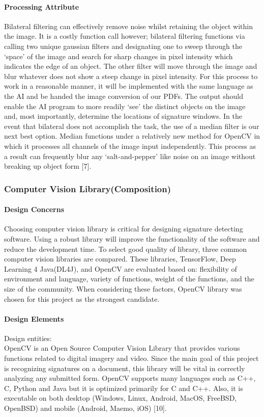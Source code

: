 \documentclass[article, onecolumn, draftclsnofoot,10pt, compsoc]{IEEEtran}
\begin{document}
\paragraph{Processing Attribute}
Bilateral filtering can effectively remove noise whilst retaining the object within the image. It is a costly function call however; bilateral filtering functions via calling two unique gaussian filters and designating one to sweep through the ‘space’ of the image and search for sharp changes in pixel intensity which indicates the edge of an object. The other filter will move through the image and blur whatever does not show a steep change in pixel intensity. For this process to work in a reasonable manner, it will be implemented with the same language as the AI and be handed the image conversion of our PDFs. The output should enable the AI program to more readily ‘see’ the distinct objects on the image and, most importantly, determine the locations of signature windows. In the event that bilateral does not accomplish the task, the use of a median filter is our next best option. Median functions under a relatively new method for OpenCV in which it processes all channels of the image input independently. This process as a result can frequently blur any ‘salt-and-pepper’ like noise on an image without breaking up object form [7].

\subsubsection{Computer Vision Library(Composition)}
\paragraph{Design Concerns}
Choosing computer vision library is critical for designing signature detecting software. Using a robust library will improve the functionality of the software and reduce the development time. To select good quality of library, three common computer vision libraries are compared. These libraries, TensorFlow, Deep Learning 4 Java(DL4J), and OpenCV are evaluated based on: flexibility of environment and language, variety of functions, weight of the functions, and the size of the community. When considering these factors, OpenCV library was chosen for this project as the strongest candidate.

\paragraph{Design Elements}
Design entities: \\
OpenCV is an Open Source Computer Vision Library that provides various functions related to digital imagery and video. Since the main goal of this project is recognizing signatures on a document, this library will be vital in correctly analyzing any submitted form. OpenCV supports many languages such as C++, C, Python and Java but it is optimized primarily for C and C++.  Also, it is executable on both desktop (Windows, Linux, Android, MacOS, FreeBSD, OpenBSD) and mobile (Android, Maemo, iOS) [10].\\
\end{document}

